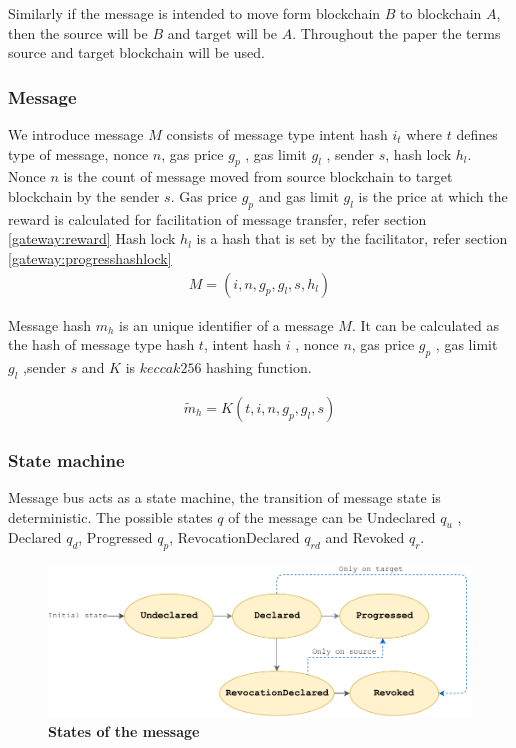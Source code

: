 \documentclass[12pt,a4paper]{article}
\begin{document}
Similarly if the message is intended to move form blockchain $B$ to blockchain $A$, then the source will be $B$ and target will be $A$.
Throughout the paper the terms source and target blockchain will be used.

\subsubsection{Message}\label{gateway:message}
We introduce message $M$ consists of message type intent hash $i_t$ where $t$ defines type of message, nonce $n$, gas price $g_p$ , gas limit $g_l$ , sender $s$, hash lock $h_l$. 
Nonce $n$ is the count of message moved from source blockchain to target blockchain by the sender $s$. 
Gas price $g_p$ and gas limit $g_l$  is the price at which the reward is calculated for facilitation of message transfer, refer section \ref{gateway:reward}  
Hash lock $h_l$ is a hash that is set by the facilitator, refer section \ref{gateway:progresshashlock} 
\begin{align}
  M = (i, n, g_p, g_l, s, h_l) 
\end{align}

Message hash $m_h$ is an unique identifier of a message $M$. It can be calculated as the hash of message type hash $t$, intent hash $i$ , nonce $n$, gas price $g_p$ , gas limit $g_l$ ,sender $s$ and $K$ is $keccak256$ hashing function. 
     
     \begin{align}
     	\tilde{m}_h = K(t, i, n, g_p, g_l, s) 
     \end{align} 

\subsubsection{State machine}\label{gateway:statemachine} 
Message bus acts as a state machine, the transition of message state is deterministic. 
The possible states $q$ of the message can be Undeclared $q_u$ , Declared $q_d$, Progressed $q_p$, RevocationDeclared $q_{rd}$  and Revoked $q_r$. 
\begin{figure}[htb]
    \centering
	\includegraphics[width=\textwidth]{state_diagram}
	\caption{\textbf{States of the message}}
	\label{fig:state_diagram}
\end{figure}
\end{document}
